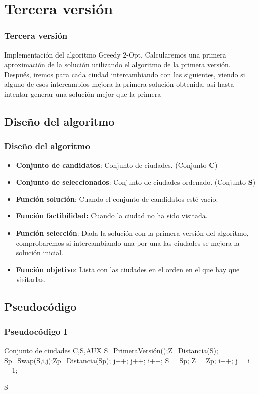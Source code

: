 \documentclass{beamer}
\begin{document}
\section{Tercera versión} 
\begin{frame}
	\frametitle{Tercera versión}
	Implementación del algoritmo Greedy 2-Opt. Calcularemos una primera aproximación de la solución utilizando el algoritmo de la primera versión. Después, iremos para cada ciudad intercambiando con las siguientes, viendo si alguno de esos intercambios mejora la primera solución obtenida, así hasta intentar generar una solución mejor que la primera
\end{frame}

\subsection{Diseño del algoritmo} 
\begin{frame}
	\frametitle{Diseño del algoritmo}
	\begin{itemize}
		\item \textbf{Conjunto de candidatos}: Conjunto de ciudades. (Conjunto \textbf{C})
		\item \textbf{Conjunto de seleccionados}: Conjunto de ciudades ordenado. (Conjunto \textbf{S})
		\item \textbf{Función solución}: Cuando el conjunto de candidatos esté vacío.
		\item \textbf{Función factibilidad:} Cuando la ciudad no ha sido visitada.
		\item \textbf{Función selección}: Dada la solución con la primera versión del algoritmo, comprobaremos si intercambiando una por una las ciudades se mejora la solución inicial.
		\item \textbf{Función objetivo}: Lista con las ciudades en el orden en el que hay que visitarlas.		
	\end{itemize}
	
\end{frame}

\subsection{Pseudocódigo}
\begin{frame}
	\frametitle{Pseudocódigo I}
	\begin{algorithmic}				
		\Require Conjunto de ciudades C,S,AUX
		\State S=PrimeraVersión();Z=Distancia(S);
			\State Sp=Swap(S,i,j);Zp=Distancia(Sp);
				\State j++;
			\EndIf
				\State j++; i++;
			\EndIf
				\State S = Sp; Z = Zp;
				\State i++; j = i + 1;
			\EndIf
		\EndWhile  
		
		\Return S	
		
	\end{algorithmic}
	
	
\end{frame}
\end{document}
